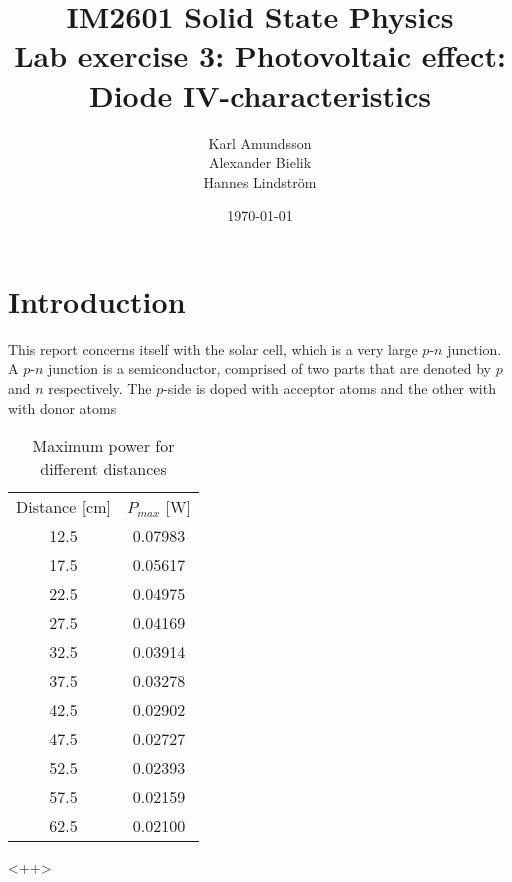\documentclass[a4paper]{article}
\begin{document}
\title{IM2601 Solid State Physics \\ Lab exercise 3: Photovoltaic effect: Diode IV-characteristics}
\author{Karl Amundsson \\ Alexander Bielik \\ Hannes Lindström}
\date{\today}
\maketitle
\newpage
\tableofcontents
\newpage
\section{Introduction}
This report concerns itself with the solar cell, which is a very large $p$-$n$ junction.
A $p$-$n$ junction is a semiconductor, comprised of two parts that are denoted by $p$ and $n$ respectively.
The $p$-side is doped with acceptor atoms and the other with with donor atoms
\begin{table}
  \centering
  \begin{tabular}{|c|c|}
    \hline
    Distance [cm] & $P_{max}$ [W] \\
    12.5 & 0.07983 \\
    17.5 & 0.05617 \\
    22.5 & 0.04975 \\
    27.5 & 0.04169 \\
    32.5 & 0.03914 \\
    37.5 & 0.03278 \\
    42.5 & 0.02902 \\
    47.5 & 0.02727 \\
    52.5 & 0.02393 \\
    57.5 & 0.02159 \\
    62.5 & 0.02100 \\
    \hline
  \end{tabular}
  \caption{Maximum power for different distances}
  \label{tab:<+label+>}
\end{table}<++>
\end{document}
